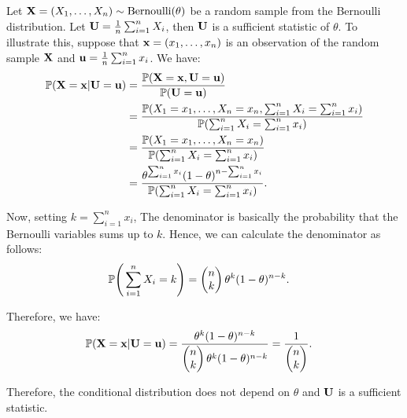 \begin{example}
    Let ${\bf X} = (X_1, \dots, X_n) \sim \mathrm{Bernoulli}(\theta)$ be a random sample from the Bernoulli distribution. Let ${\bf U} = \frac{1}{n}\sum_{i=1}^n X_i$, then ${\bf U}$ is a sufficient statistic of $\theta$. To illustrate this, suppose that ${\bf x} = (x_1, \dots, x_n)$ is an observation of the random sample ${\bf X}$ and ${\bf u} = \frac{1}{n}\sum_{i=1}^n x_i$. We have:
    \begin{align*}
        \mathbb{P}({\bf X}={\bf x}| {\bf U}={\bf u}) &= \frac{\mathbb{P}({\bf X}={\bf x}, {\bf U}={\bf u})}{\mathbb{P}({\bf U}={\bf u})} \\
            &= \frac{\mathbb{P}(X_1=x_1, \dots, X_n=x_n, \sum_{i=1}^n X_i = \sum_{i=1}^n x_i)}{\mathbb{P}(\sum_{i=1}^n X_i = \sum_{i=1}^n x_i)} \\
            &= \frac{\mathbb{P}(X_1=x_1, \dots, X_n=x_n)}{\mathbb{P}(\sum_{i=1}^n X_i = \sum_{i=1}^n x_i)} \\
            &= \frac{\theta^{\sum_{i=1}^n x_i}(1-\theta)^{n-\sum_{i=1}^n x_i}}{\mathbb{P}(\sum_{i=1}^n X_i = \sum_{i=1}^n x_i)}.
    \end{align*}

    \noindent Now, setting $k=\sum_{i=1}^n x_i$, The denominator is basically the probability that the Bernoulli variables sums up to $k$. Hence, we can calculate the denominator as follows:
    \begin{align*}
        \mathbb{P}\Bigg( \sum_{i=1}^n X_i = k \Bigg) &= \begin{pmatrix}
            n \\ k
        \end{pmatrix} \theta^k(1-\theta)^{n - k}.
    \end{align*}

    \noindent Therefore, we have:
    \begin{align*}
        \mathbb{P}({\bf X} = {\bf x} | {\bf U} = {\bf u}) &= \frac{\theta^k(1-\theta)^{n-k}}{
            \begin{pmatrix}
                n \\ k
            \end{pmatrix} \theta^k(1-\theta)^{n - k}
        } = \frac{1}{
            \begin{pmatrix}
                n \\ k
            \end{pmatrix}
        }.
    \end{align*}

    \noindent Therefore, the conditional distribution does not depend on $\theta$ and ${\bf U}$ is a sufficient statistic.
\end{example}

